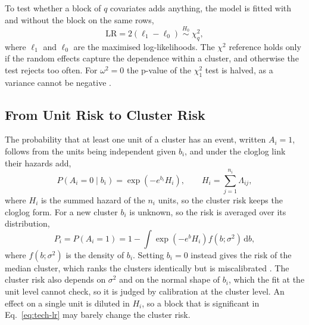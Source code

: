 To test whether a block of $q$ covariates adds anything, the model is fitted with and without the block on the same rows,
\begin{equation}
  \mathrm{LR} = 2\left(\ell_1 - \ell_0\right) \;\overset{H_0}{\sim}\; \chi^2_q ,
  \label{eq:tech-lr}
\end{equation}
where $\ell_1$ and $\ell_0$ are the maximised log-likelihoods.
The $\chi^2$ reference holds only if the random effects capture the dependence within a cluster, and otherwise the test rejects too often.
For $\omega^2 = 0$ the p-value of the $\chi^2_1$ test is halved, as a variance cannot be negative \cite{self1987boundary, stram1994variance}.

\subsection{From Unit Risk to Cluster Risk}
\label{sec:tech-aggregation}

The probability that at least one unit of a cluster has an event, written $A_i = 1$, follows from the units being independent given $b_i$, and under the cloglog link their hazards add,
\begin{equation}
  P(A_i = 0 \mid b_i) = \exp\!\left(-e^{b_i} H_i\right),
  \qquad
  H_i = \sum_{j=1}^{n_i} \Lambda_{ij} ,
  \label{eq:tech-agg-conditional}
\end{equation}
where $H_i$ is the summed hazard of the $n_i$ units, so the cluster risk keeps the cloglog form.
For a new cluster $b_i$ is unknown, so the risk is averaged over its distribution,
\begin{equation}
  P_i = P(A_i = 1) = 1 - \int \exp\!\left(-e^{b} H_i\right) f(b;\sigma^2)\,\mathrm{d}b ,
  \label{eq:tech-agg-marginal}
\end{equation}
where $f(b;\sigma^2)$ is the density of $b_i$.
Setting $b_i = 0$ instead gives the risk of the median cluster, which ranks the clusters identically but is miscalibrated \cite{pavlou2015marginal, skrondal2009prediction}.
The cluster risk also depends on $\sigma^2$ and on the normal shape of $b_i$, which the fit at the unit level cannot check, so it is judged by calibration at the cluster level.
An effect on a single unit is diluted in $H_i$, so a block that is significant in Eq.~\eqref{eq:tech-lr} may barely change the cluster risk.
